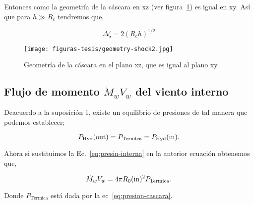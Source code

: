 Entonces como la geometría de la cáscara en xz (ver figura~\ref{fig:geometria1}) es igual en xy. Así que para \(h \gg R_{c}\) tendremos que,

\begin{equation}
  \label{eq:vision}
  \Delta \zeta = 2(R_{c}h)^{1/2}
\end{equation}

\begin{figure}
  \centering
  \texttt{[image: figuras-tesis/geometry-shock2.jpg]}
  \caption{Geometría de la cáscara en el plano xz, que es igual al plano xy.}
  \label{fig:geometria1}
\end{figure}

\subsection{Flujo de momento \(\dot{M}_{w}V_{w}\) del viento interno}
\label{sec:momento}

Deacuerdo a la suposición 1, existe un equilibrio de presiones de tal manera que podemos establecer;
 
\begin{equation}
  \label{eq:igualda-presion}
  P_{\text{Hyd}}(\mathrm{out}{})=P_{\text{Termica}}=P_{\text{Hyd}}(\mathrm{in}{}).
\end{equation}

Ahora si sustituimos la Ec.~\ref{eq:presin-interna} en la anterior ecuación obtenemos que,

\begin{equation}
  \label{eq:momentum}
   \dot{M}_{w}V_{w} = 4 \pi  R_{0}(\mathrm{in}{})^{2}  P_{\text{Termica}}. 
\end{equation}

Donde \(P_{\text{Termica}}\) está dada por la ec~\ref{eq:presion-cascara}. 

%

%
